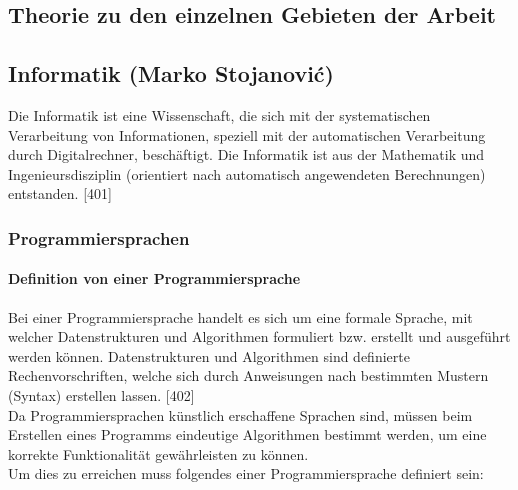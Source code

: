 \documentclass[12pt,a4paper]{report}
\begin{document}
\begin{onehalfspace}
\part{Theorie zu den einzelnen Gebieten der Arbeit}

\chapter{Informatik (Marko Stojanovi\'{c})}

Die Informatik ist eine Wissenschaft, die sich mit der systematischen Verarbeitung von Informationen, speziell mit der automatischen Verarbeitung durch Digitalrechner, beschäftigt. Die Informatik ist aus der Mathematik und Ingenieursdisziplin (orientiert nach automatisch angewendeten Berechnungen) entstanden. [401]

\section{Programmiersprachen}

\subsection{Definition von einer Programmiersprache}
Bei einer Programmiersprache handelt es sich um eine formale Sprache, mit welcher Datenstrukturen und Algorithmen formuliert bzw. erstellt und ausgeführt werden können. Datenstrukturen und Algorithmen sind definierte Rechenvorschriften, welche sich durch Anweisungen nach bestimmten Mustern (Syntax) erstellen lassen. [402]\\

Da Programmiersprachen künstlich erschaffene Sprachen sind, müssen beim Erstellen eines Programms eindeutige Algorithmen bestimmt werden, um eine korrekte Funktionalität gewährleisten zu können.\\
Um dies zu erreichen muss folgendes einer Programmiersprache definiert sein:


\end{onehalfspace}
\end{document}
